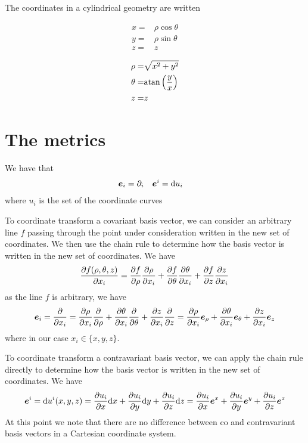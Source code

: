 The coordinates in a cylindrical geometry are written\\
%
\begin{minipage}{0.4\textwidth}
\begin{align*}
    x=&\rho \cos\theta\\
    y=&\rho \sin\theta\\
    z=& z
\end{align*}
\end{minipage}
\hfill
\begin{minipage}{0.4\textwidth}
\begin{align*}
    \rho=& \sqrt{x^2+y^2}\\
    \theta=&\text{atan}\left(\frac{y}{x}\right)\\
    z=& z
\end{align*}
\end{minipage}

\section{The metrics}
\label{sec:metr}
%
We have that
%
\begin{align*}
    &\boldsymbol{e}_i = \partial_i&
    &\boldsymbol{e}^i = \text{d} u_i&
\end{align*}
%
where $u_i$ is the set of the coordinate curves

To coordinate transform a covariant basis vector, we can consider an arbitrary line $f$ passing through the point under consideration written in the new set of coordinates.
We then use the chain rule to determine how the basis vector is written in the new set of coordinates.
We have
%
\begin{align*}
    \frac{\partial {f(\rho, \theta, z)}}{\partial{x_i}}
    =
    \frac{\partial {f}}{\partial{\rho}} \frac{\partial {\rho}}{\partial{x_i}}
    + \frac{\partial {f}}{\partial{\theta}} \frac{\partial {\theta}}{\partial{x_i}}
    + \frac{\partial {f}}{\partial{z}} \frac{\partial {z}}{\partial{x_i}}
\end{align*}
%
as the line $f$ is arbitrary, we have
%
\begin{align*}
    \boldsymbol{e}_i
    =
    \frac{\partial {}}{\partial{x_i}}
    =
    \frac{\partial {\rho}}{\partial{x_i}} \frac{\partial {}}{\partial{\rho}}
    + \frac{\partial {\theta}}{\partial{x_i}} \frac{\partial {}}{\partial{\theta}}
    + \frac{\partial {z}}{\partial{x_i}} \frac{\partial {}}{\partial{z}}
    =
    \frac{\partial {\rho}}{\partial{x_i}} \boldsymbol{e}_{\rho}
    + \frac{\partial {\theta}}{\partial{x_i}} \boldsymbol{e}_{\theta}
    + \frac{\partial {z}}{\partial{x_i}} \boldsymbol{e}_{z}
\end{align*}
%
where in our case $x_i \in \{x,y,z\}$.

To coordinate transform a contravariant basis vector, we can apply the chain rule directly to determine how the basis vector is written in the new set of coordinates.
We have
%
\begin{align*}
    \boldsymbol{e}^i
    =
    \text{d} u^i(x,y,z)
    =
    \frac{\partial {u_i}}{\partial{x}}\text{d} x
    + \frac{\partial {u_i}}{\partial{y}}\text{d} y
    + \frac{\partial {u_i}}{\partial{z}}\text{d} z
    =
    \frac{\partial {u_i}}{\partial{x}}\boldsymbol{e}^x
    + \frac{\partial {u_i}}{\partial{y}}\boldsymbol{e}^y
    + \frac{\partial {u_i}}{\partial{z}}\boldsymbol{e}^z
\end{align*}
%
At this point we note that there are no difference between co and contravariant basis vectors in a Cartesian coordinate system.

